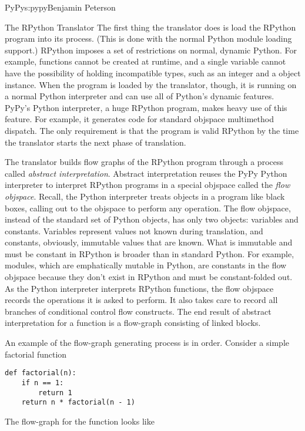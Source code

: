 \begin{aosachapter}{PyPy}{s:pypy}{Benjamin Peterson}
\begin{aosasect1}{The RPython Translator}
The first thing the translator does is load the RPython program into its
process. (This is done with the normal Python module loading support.) RPython
imposes a set of restrictions on normal, dynamic Python. For example, functions
cannot be created at runtime, and a single variable cannot have the possibility
of holding incompatible types, such as an integer and a object instance. When
the program is loaded by the translator, though, it is running on a normal
Python interpreter and can use all of Python's dynamic features. PyPy's Python
interpreter, a huge RPython program, makes heavy use of this feature. For
example, it generates code for standard objspace multimethod dispatch. The only
requirement is that the program is valid RPython by the time the translator
starts the next phase of translation.

The translator builds flow graphs of the RPython program through a process
called \emph{abstract interpretation}. Abstract interpretation reuses the PyPy
Python interpreter to interpret RPython programs in a special objspace called
the \emph{flow objspace}. Recall, the Python interpreter treats objects in a
program like black boxes, calling out to the objspace to perform any
operation. The flow objspace, instead of the standard set of Python objects, has
only two objects: variables and constants. Variables represent values not known
during translation, and constants, obviously, immutable values that are
known. What is immutable and must be constant in RPython is broader than in
standard Python. For example, modules, which are emphatically mutable in Python,
are constants in the flow objspace because they don't exist in RPython and must
be constant-folded out. As the Python interpreter interprets RPython functions,
the flow objspace records the operations it is asked to perform. It also takes
care to record all branches of conditional control flow constructs. The end
result of abstract interpretation for a function is a flow-graph consisting of
linked blocks.

An example of the flow-graph generating process is in order. Consider a simple
factorial function

\begin{verbatim}
def factorial(n):
    if n == 1:
        return 1
    return n * factorial(n - 1)
\end{verbatim}

The flow-graph for the function looks like 



\end{aosasect1}
\end{aosachapter}
